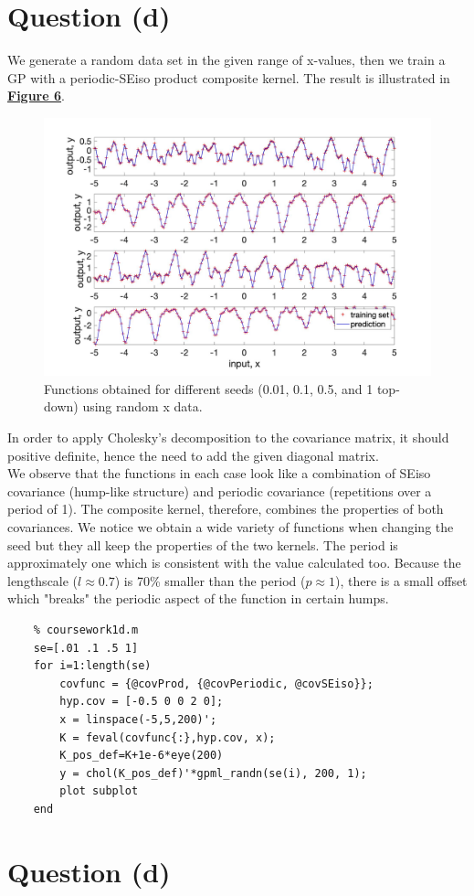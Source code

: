 \documentclass[a4paper,11pt]{article}
\begin{document}
\section*{Question (d)}
We generate a random data set in the given range of x-values, then we train a GP with a periodic-SEiso product composite kernel. The result is illustrated in \hyperref[fig:6]{\textbf{Figure 6}}.
\begin{figure}[H]
	\centering
	\includegraphics[width=\linewidth]{figures/d1.jpg}
	\caption{Functions obtained for different seeds (0.01, 0.1, 0.5, and 1 top-down) using random x data.}
	\label{fig:6}
\end{figure} 
In order to apply Cholesky's decomposition to the covariance matrix, it should positive definite, hence the need to add the given diagonal matrix.\\
We observe that the functions in each case look like a combination of SEiso covariance (hump-like structure) and periodic covariance (repetitions over a period of 1). The composite kernel, therefore, combines the properties of both covariances. We notice we obtain a wide variety of functions when changing the seed but they all keep the properties of the two kernels. The period is approximately one which is consistent with the value calculated too. Because the lengthscale ($l \approx 0.7$) is 70\% smaller than the period ($p\approx1$), there is a small offset which "breaks" the periodic aspect of the function in certain humps.
\begin{lstlisting}
	% coursework1d.m
	se=[.01 .1 .5 1]
	for i=1:length(se)
		covfunc = {@covProd, {@covPeriodic, @covSEiso}};
		hyp.cov = [-0.5 0 0 2 0];
		x = linspace(-5,5,200)';
		K = feval(covfunc{:},hyp.cov, x);
		K_pos_def=K+1e-6*eye(200)
		y = chol(K_pos_def)'*gpml_randn(se(i), 200, 1);
		plot subplot
	end
\end{lstlisting}
\section*{Question (d)}

	
	
	
	
	
\end{document}
